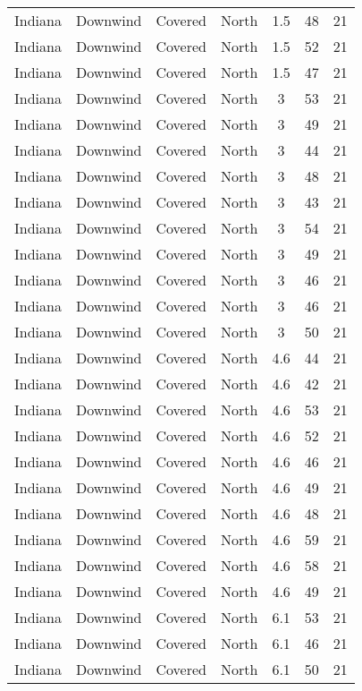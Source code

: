\documentclass{article}
\begin{document}
\begin{longtable}[H]{ccccccc}
Indiana & Downwind & Covered     & North  & 1.5  & 48 & 21 \\
Indiana & Downwind & Covered     & North  & 1.5  & 52 & 21 \\
Indiana & Downwind & Covered     & North  & 1.5  & 47 & 21 \\
Indiana & Downwind & Covered     & North  & 3    & 53 & 21 \\
Indiana & Downwind & Covered     & North  & 3    & 49 & 21 \\
Indiana & Downwind & Covered     & North  & 3    & 44 & 21 \\
Indiana & Downwind & Covered     & North  & 3    & 48 & 21 \\
Indiana & Downwind & Covered     & North  & 3    & 43 & 21 \\
Indiana & Downwind & Covered     & North  & 3    & 54 & 21 \\
Indiana & Downwind & Covered     & North  & 3    & 49 & 21 \\
Indiana & Downwind & Covered     & North  & 3    & 46 & 21 \\
Indiana & Downwind & Covered     & North  & 3    & 46 & 21 \\
Indiana & Downwind & Covered     & North  & 3    & 50 & 21 \\
Indiana & Downwind & Covered     & North  & 4.6  & 44 & 21 \\
Indiana & Downwind & Covered     & North  & 4.6  & 42 & 21 \\
Indiana & Downwind & Covered     & North  & 4.6  & 53 & 21 \\
Indiana & Downwind & Covered     & North  & 4.6  & 52 & 21 \\
Indiana & Downwind & Covered     & North  & 4.6  & 46 & 21 \\
Indiana & Downwind & Covered     & North  & 4.6  & 49 & 21 \\
Indiana & Downwind & Covered     & North  & 4.6  & 48 & 21 \\
Indiana & Downwind & Covered     & North  & 4.6  & 59 & 21 \\
Indiana & Downwind & Covered     & North  & 4.6  & 58 & 21 \\
Indiana & Downwind & Covered     & North  & 4.6  & 49 & 21 \\
Indiana & Downwind & Covered     & North  & 6.1  & 53 & 21 \\
Indiana & Downwind & Covered     & North  & 6.1  & 46 & 21 \\
Indiana & Downwind & Covered     & North  & 6.1  & 50 & 21 \\

\end{longtable}
\end{document}
